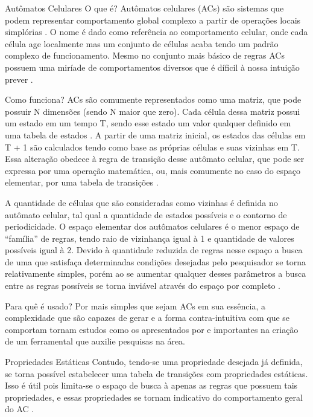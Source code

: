 Autômatos Celulares	
	O que é?
Autômatos celulares (ACs) são sistemas que podem representar comportamento global complexo a partir de operações locais simplórias \cite{wolfram2002}. O nome é dado como referência ao comportamento celular, onde cada célula age localmente mas um conjunto de células acaba tendo um padrão complexo de funcionamento. Mesmo no conjunto mais básico de regras ACs possuem uma miríade de comportamentos diversos que é díficil à nossa intuição prever \cite{wolfram2002}.

	Como funciona?
ACs são comumente representados como uma matriz, que pode possuir N dimensões (sendo N maior que zero). Cada célula dessa matriz possui um estado em um tempo T, sendo esse estado um valor qualquer definido em uma tabela de estados \cite {nubia2016}. A partir de uma matriz inicial, os estados das células em T + 1 são calculados tendo como base as próprias células e suas vizinhas em T. Essa alteração obedece à regra de transição desse autômato celular, que pode ser expressa por uma operação matemática, ou, mais comumente no caso do espaço elementar, por uma tabela de transições \cite{wolfram2002}.

A quantidade de células que são consideradas como vizinhas é definida no autômato celular, tal qual a quantidade de estados possíveis e o contorno de periodicidade. O espaço elementar dos autômatos celulares é o menor espaço de ``família'' de regras, tendo raio de vizinhança igual à 1 e quantidade de valores possíveis igual à 2. Devido à quantidade reduzida de regras nesse espaço a busca de uma que satisfaça determinadas condições desejadas pelo pesquisador se torna relativamente simples, porém ao se aumentar qualquer desses parâmetros a busca entre as regras possíveis se torna inviável através do espaço por completo \cite{zorandir2016}.

	Para quê é usado?
Por mais simples que sejam ACs em sua essência, a complexidade que são capazes de gerar e a forma contra-intuitiva com que se comportam \cite{wolfram2002} tornam estudos como os apresentados por  e  importantes na criação de um ferramental que auxilie pesquisas na área.


	Propriedades Estáticas
Contudo, tendo-se uma propriedade desejada já definida, se torna possível estabelecer uma tabela de transições com propriedades estáticas. Isso é útil pois limita-se o espaço de busca à apenas as regras que possuem tais propriedades, e essas propriedades se tornam indicativo do comportamento geral do AC \cite{verardo2014}.

